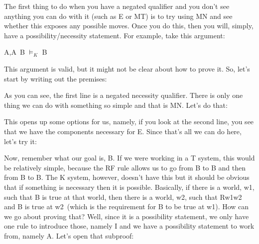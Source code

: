 The first thing to do when you have a negated qualifier and you don't see anything you can do with it (such as \eor E or MT) is to try using MN and see whether this exposes any possible moves. Once you do this, then you will, simply, have a possibility/necessity statement. For example, take this argument:
\begin{center}
\enot \ebox A,\ediamond \enot A\eif  \ebox B $\vDash_K$ \ediamond B
\end{center}
This argument is valid, but it might not be clear about how to prove it. So, let's start by writing out the premises:
\begin{fitchproof}
\end{fitchproof}
As you can see, the first line is a negated necessity qualifier. There is only one thing we can do with something so simple and that is MN. Let's do that:
\begin{fitchproof}
\end{fitchproof}
This opens up some options for us, namely, if you look at the second line, you see that we have the components necessary for \eif E. Since that's all we can do here, let's try it:
\begin{fitchproof}
\end{fitchproof}
Now, remember what our goal is, \ediamond B. If we were working in a T system, this would be relatively simple, because the RF rule allows us to go from \ebox B to B and then from B to \ediamond B. The K system, however, doesn't have this but it should be obvious that if something is necessary then it is possible. Basically, if there is a world, w1, such that \ebox B is true at that world, then there is a world, w2, such that Rw1w2  and B is true at w2 (which is the requirement for \ediamond B to be true at w1). How can we go about proving that? Well, since it is a possibility statement, we only have one rule to introduce those, namely \ediamond I and we have a possibility statement to work from, namely \ediamond \enot A. Let's open that subproof:
\begin{fitchproof}
\open
{} 
\end{fitchproof}

